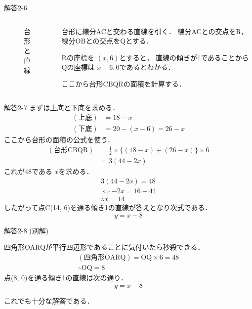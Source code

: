 \documentclass[dvipdfmx]{beamer}
\begin{document}
	\begin{frame}{解答2-6}
		\begin{columns}
			\begin{column}{0.5\textwidth}
				\begin{figure}[htbp]
					\centering
					\caption{台形と直線}
				\end{figure}
				
			\end{column}

			\begin{column}{0.5\textwidth}
				台形に線分ACと交わる直線を引く．
				線分ACとの交点をR，線分OBとの交点をQとする．

				Rの座標を $(x, 6)$とすると，
				直線の傾きが1であることからQの座標は
				$x-6, 0$であるとわかる．

				ここから台形CBQRの面積を計算する．

			\end{column}
		\end{columns}
		
	\end{frame}

	\begin{frame}{解答2-7}
		まずは上底と下底を求める．
		\begin{align*}
			(\text{上底})&= 18 -x\\
			(\text{下底})&= 20 -(x-6) = 26-x
		\end{align*}
		ここから台形の面積の公式を使う．
		\begin{align*}
			(\text{台形CBQR}) &= \frac{1}{2}\times
			\{ (18-x)+(26-x) \}\times6\\
							  &= 3(44 -2x)
		\end{align*}
		これが48である $x$を求める．
		\begin{gather*}
			3(44-2x)=48\\
			\Leftrightarrow -2x = 16-44\\
			\therefore x = 14
		\end{gather*}
		したがって点C(14, 6)を通る傾き1の直線が答えとなり次式である．
		\[y =x -8\]
	\end{frame}

	\begin{frame}{解答2-8}
		(別解)

		四角形OARQが平行四辺形であることに気付いたら秒殺できる．
		\begin{gather*}
			(\text{四角形OARQ}) = \mathrm{OQ}\times 6=48\\
			\therefore\mathrm{OQ}=8
		\end{gather*}
		点(8, 0)を通る傾き1の直線は次の通り．
		\[y =x -8\]

		これでも十分な解答である．
	\end{frame}
\end{document}
